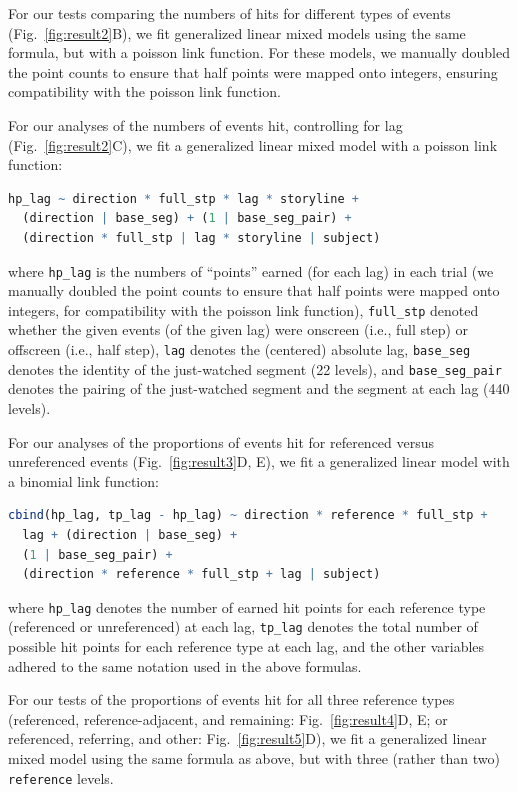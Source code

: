\documentclass[10pt]{article}
\begin{document}
For our tests comparing the numbers of hits for different types of events (Fig.~\ref{fig:result2}B), we fit generalized linear mixed models using the same formula, but with a poisson link function.  For these models, we manually doubled the point counts to ensure that half points were mapped onto integers, ensuring compatibility with the poisson link function.

For our analyses of the numbers of events hit, controlling for lag (Fig.~\ref{fig:result2}C), we fit a generalized linear mixed model with a poisson link function:
\begin{lstlisting}[language=R]
  hp_lag ~ direction * full_stp * lag * storyline +
  (direction | base_seg) + (1 | base_seg_pair) +
  (direction * full_stp | lag * storyline | subject)
  \end{lstlisting}
where \texttt{hp\_lag} is the numbers of ``points'' earned (for each lag) in each trial (we manually doubled the point counts to ensure that half points were mapped onto integers, for compatibility with the poisson link function), \texttt{full\_stp} denoted whether the given events (of the given lag) were onscreen (i.e., full step) or offscreen (i.e., half step), \texttt{lag} denotes the (centered) absolute lag, \texttt{base\_seg} denotes the identity of the just-watched segment (22 levels), and \texttt{base\_seg\_pair} denotes the pairing of the just-watched segment and the segment at each lag (440 levels).

For our analyses of the proportions of events hit for referenced versus unreferenced events (Fig.~\ref{fig:result3}D, E), we fit a generalized linear model with a binomial link function:
\begin{lstlisting}[language=R]
  cbind(hp_lag, tp_lag - hp_lag) ~ direction * reference * full_stp +
  lag + (direction | base_seg) +
  (1 | base_seg_pair) +
  (direction * reference * full_stp + lag | subject)
\end{lstlisting}
where \texttt{hp\_lag} denotes the number of earned hit points for each reference type (referenced or unreferenced) at each lag, \texttt{tp\_lag} denotes the total number of possible hit points for each reference type at each lag, and the other variables adhered to the same notation used in the above formulas.

For our tests of the proportions of events hit for all three reference types (referenced, reference-adjacent, and remaining: Fig.~\ref{fig:result4}D, E; or referenced, referring, and other: Fig.~\ref{fig:result5}D), we fit a generalized linear mixed model using the same formula as above, but with three (rather than two) \texttt{reference} levels.
\end{document}
